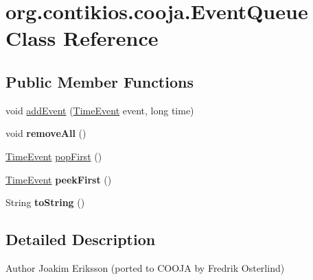 \hypertarget{classorg_1_1contikios_1_1cooja_1_1EventQueue}{\section{org.\-contikios.\-cooja.\-Event\-Queue Class Reference}
\label{classorg_1_1contikios_1_1cooja_1_1EventQueue}
}
\subsection*{Public Member Functions}
\begin{DoxyCompactItemize}
\item 
void \hyperlink{classorg_1_1contikios_1_1cooja_1_1EventQueue_af77e94c75d1e897329585af90d63a228}{add\-Event} (\hyperlink{classorg_1_1contikios_1_1cooja_1_1TimeEvent}{Time\-Event} event, long time)
\item 
\hypertarget{classorg_1_1contikios_1_1cooja_1_1EventQueue_a133265d84748cad8ba08f8dc06e00362}{void {\bfseries remove\-All} ()}\label{classorg_1_1contikios_1_1cooja_1_1EventQueue_a133265d84748cad8ba08f8dc06e00362}

\item 
\hyperlink{classorg_1_1contikios_1_1cooja_1_1TimeEvent}{Time\-Event} \hyperlink{classorg_1_1contikios_1_1cooja_1_1EventQueue_a44f7ce071f5e541415e061964b3f17fd}{pop\-First} ()
\item 
\hypertarget{classorg_1_1contikios_1_1cooja_1_1EventQueue_a781f17b00625d93f939e7dd3ed5eb27a}{\hyperlink{classorg_1_1contikios_1_1cooja_1_1TimeEvent}{Time\-Event} {\bfseries peek\-First} ()}\label{classorg_1_1contikios_1_1cooja_1_1EventQueue_a781f17b00625d93f939e7dd3ed5eb27a}

\item 
\hypertarget{classorg_1_1contikios_1_1cooja_1_1EventQueue_a835b2c652959b915e995b49d94f78b39}{String {\bfseries to\-String} ()}\label{classorg_1_1contikios_1_1cooja_1_1EventQueue_a835b2c652959b915e995b49d94f78b39}

\end{DoxyCompactItemize}


\subsection{Detailed Description}
\begin{DoxyAuthor}{Author}
Joakim Eriksson (ported to C\-O\-O\-J\-A by Fredrik Osterlind) 
\end{DoxyAuthor}


